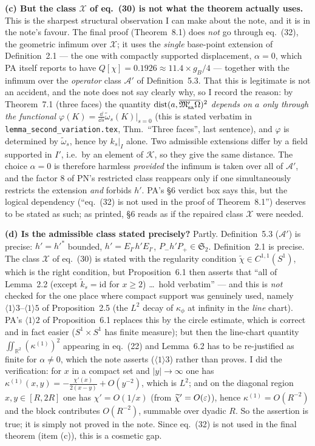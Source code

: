\documentclass[11pt]{article}
\newcommand{\kt}{\widetilde k}
\newcommand{\Pp}{P_+}\newcommand{\Pm}{P_-}
\providecommand{\Om}{\Omega}\providecommand{\Gm}{\Gamma}\providecommand{\Qt}{\widetilde Q}
\providecommand{\dist}{\operatorname{dist}}\providecommand{\Var}{\operatorname{Var}}
\providecommand{\Stwo}{\mathfrak S_2}\providecommand{\Sone}{\mathfrak S_1}
\begin{document}
\textbf{(c) But the class $\mathcal X$ of eq.~(30) is not what the theorem actually uses.}  This is
the sharpest structural observation I can make about the note, and it is in the note's favour.  The
final proof (Theorem~8.1) does \emph{not} go through eq.~(32), the geometric infimum over
$\mathcal X$; it uses the \emph{single} base-point extension of Definition~2.1 --- the one with
compactly supported displacement, $\alpha=0$, which PA itself reports to have
$Q[\chi]=0.1926\approx11.4\times g_B/4$ --- together with the infimum over the \emph{operator} class
$\mathcal A'$ of Definition~5.3.  That this is legitimate is not an accident, and the note does not
say clearly why, so I record the reason: by Theorem~7.1 (three faces) the quantity
$\dist(a,\overline{\Mpsa\Om})^2$ \emph{depends on $a$ only through the functional
$\varphi(K)=\frac{\dd}{\dd s}\widetilde\omega_s(K)|_{s=0}$} (this is stated verbatim in
\texttt{lemma\_second\_variation.tex}, Thm.\ ``Three faces'', last sentence), and $\varphi$ is
determined by $\widetilde\omega_s$, hence by $k_s|_I$ alone.  Two admissible extensions differ by a
field supported in $I'$, i.e.\ by an element of $\mathcal K$, so they give the same distance.  The
choice $\alpha=0$ is therefore harmless \emph{provided} the infimum is taken over all of
$\mathcal A'$, and the factor $8$ of PN's restricted class reappears only if one simultaneously
restricts the extension \emph{and} forbids $h'$.  PA's \S6 verdict box says this, but the logical
dependency (``eq.~(32) is not used in the proof of Theorem~8.1'') deserves to be stated as such;
as printed, \S6 reads as if the repaired class $\mathcal X$ were needed.

\textbf{(d) Is the admissible class stated precisely?}  Partly.  Definition~5.3 ($\mathcal A'$) is
precise: $h'=h'^*$ bounded, $h'=E_{I'}h'E_{I'}$, $\Pm h'\Pp\in\Stwo$.  Definition~2.1 is precise.
The class $\mathcal X$ of eq.~(30) is stated with the regularity condition
$\widetilde\chi\in C^{1,1}(S^1)$, which is the right condition, but Proposition~6.1 then asserts that
``all of Lemma~2.2 (except $\kt_s=\mathrm{id}$ for $x\ge2$) \dots\ hold verbatim'' --- and this is
\emph{not} checked for the one place where compact support was genuinely used, namely
$\langle1\rangle3$--$\langle1\rangle5$ of Proposition~2.5 (the $L^2$ decay of $\kappa_\phi$ at
infinity in the \emph{line} chart).  PA's $\langle1\rangle2$ of Proposition~6.1 replaces this by the
circle estimate, which is correct and in fact easier ($S^1\times S^1$ has finite measure); but then
the line-chart quantity $\iint_{\mathbb R^2}(\kappa^{(1)})^2$ appearing in eq.~(22) and
Lemma~6.2 has to be re-justified as finite for $\alpha\ne0$, which the note asserts
($\langle1\rangle3$) rather than proves.  I did the verification: for
$x$ in a compact set and $|y|\to\infty$ one has $\kappa^{(1)}(x,y)=-\frac{\chi'(x)}{2(x-y)}+O(y^{-2})$,
which is $L^2$; and on the diagonal region $x,y\in[R,2R]$ one has $\chi'=O(1/x)$ (from
$\widetilde\chi'=O(\varepsilon)$), hence $\kappa^{(1)}=O(R^{-2})$ and the block contributes $O(R^{-2})$,
summable over dyadic $R$.  So the assertion is true; it is simply not proved in the note.  Since eq.~(32) is not used in the
final theorem (item (c)), this is a cosmetic gap.
\end{document}
